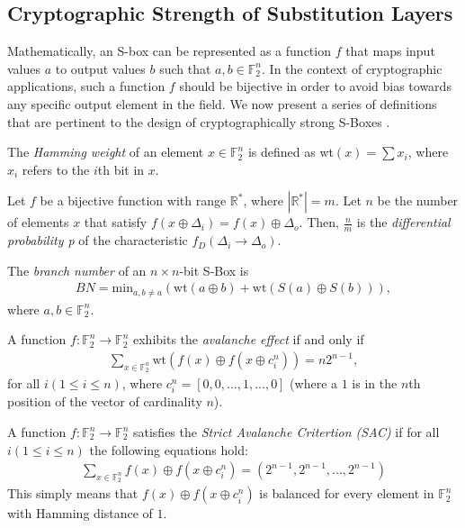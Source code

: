 \documentclass[11pt]{article}
\newcommand{\field}[1]{\mathbb{#1}} %
\begin{document}
\subsection{Cryptographic Strength of Substitution Layers}
Mathematically, an S-box can be represented as a function $f$ that maps input values $a$ to output values $b$ such that $a,b \in \field{F}_2^n$. In the context of cryptographic applications, such a function $f$ should be bijective in order to avoid bias towards any specific output element in the field. We now present a series of definitions that are pertinent to the design of cryptographically strong S-Boxes \cite{Mar_newanalysis}.


\begin{define}
The \emph{Hamming weight} of an element $x \in \field{F}_2^n$ is defined as wt$(x) = \sum x_i$, where $x_i$ refers to the $i$th bit in $x$.
\end{define}

\begin{define}
Let $f$ be a bijective function with range $\mathbb{R^*}$, where $|\mathbb{R^*}| = m$. Let $n$ be the number of elements $x$ that satisfy $f(x \oplus \Delta_i) = f(x) \oplus \Delta_o$. Then, $\frac{n}{m}$ is the \emph{differential probability p} of the characteristic $f_D(\Delta_i \to \Delta_o)$.
\end{define}

\begin{define}
The \emph{branch number} of an $n \times n$-bit S-Box is
\begin{eqnarray*}
BN = \text{min}_{a, b\not=a}(\text{wt}(a \oplus b) + \text{wt}(S(a) \oplus S(b))),
\end{eqnarray*}
where $a, b \in \field{F}_2^n$.
\end{define}

\begin{define}
A function $f : \field{F}_2^n \to \field{F}_2^n$ exhibits the \emph{avalanche effect} if and only if 
\begin{eqnarray*}
\sum_{x \in \field{F}_2^n} \text{wt}(f(x) \oplus f(x \oplus c_{i}^{n})) = n2^{n-1},
\end{eqnarray*}
for all $i (1 \leq i \leq n)$, where $c_{i}^{n} = [0, 0, ..., 1, ..., 0]$ (where a $1$ is in the $n$th position of the vector of cardinality $n$).
\end{define}

\begin{define}
A function $f : \field{F}_2^n \to \field{F}_2^n$ satisfies the \emph{Strict Avalanche Critertion (SAC)} if for all $i (1 \leq i \leq n)$ the following equations hold:
\begin{eqnarray*}
\sum_{x \in \field{F}_2^n} f(x) \oplus f(x \oplus c_i^n) = (2^{n-1}, 2^{n-1}, ..., 2^{n-1})
\end{eqnarray*}
This simply means that $f(x) \oplus f(x \oplus c_i^n)$ is balanced for every element in $\field{F}_2^n$ with Hamming distance of $1$. 
\end{define}
\end{document}
